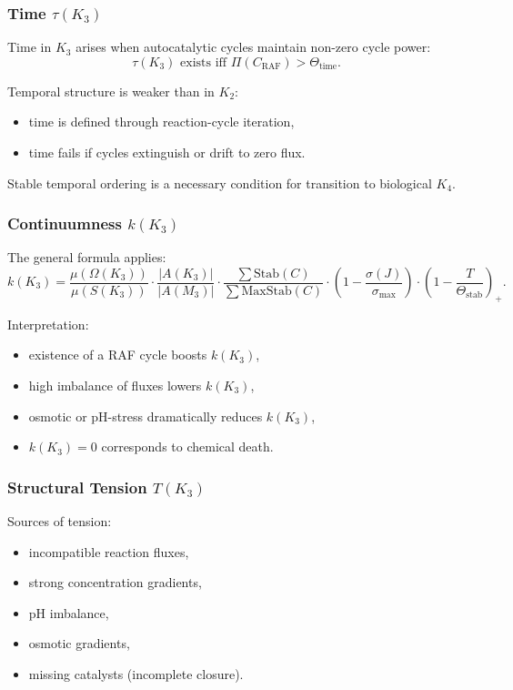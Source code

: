 \subsubsection{Time \texorpdfstring{$\tau(K_3)$}{\tau(K_3)}}

Time in $K_3$ arises when autocatalytic cycles maintain non-zero cycle
power:
\[
\tau(K_3) \text{ exists iff } \Pi(C_{\mathrm{RAF}}) >
\Theta_{\mathrm{time}}.
\]

Temporal structure is weaker than in $K_2$:
\begin{itemize}
    \item time is defined through reaction-cycle iteration,
    \item time fails if cycles extinguish or drift to zero flux.
\end{itemize}

Stable temporal ordering is a necessary condition for transition to
biological $K_4$.

\subsubsection{Continuumness \texorpdfstring{$k(K_3)$}{k(K_3)}}

The general formula applies:
\[
k(K_3) = 
\frac{\mu(\Omega(K_3))}{\mu(S(K_3))}
\cdot
\frac{|A(K_3)|}{|A(M_3)|}
\cdot
\frac{\sum \mathrm{Stab}(C)}{\sum \mathrm{MaxStab}(C)}
\cdot
(1 - \frac{\sigma(J)}{\sigma_{\max}})
\cdot
(1 - \frac{T}{\Theta_{\mathrm{stab}}})_+.
\]

Interpretation:
\begin{itemize}
    \item existence of a RAF cycle boosts $k(K_3)$,
    \item high imbalance of fluxes lowers $k(K_3)$,
    \item osmotic or pH-stress dramatically reduces $k(K_3)$,
    \item $k(K_3)=0$ corresponds to chemical death.
\end{itemize}

\subsubsection{Structural Tension \texorpdfstring{$T(K_3)$}{T(K_3)}}

Sources of tension:
\begin{itemize}
    \item incompatible reaction fluxes,
    \item strong concentration gradients,
    \item pH imbalance,
    \item osmotic gradients,
    \item missing catalysts (incomplete closure).
\end{itemize}

